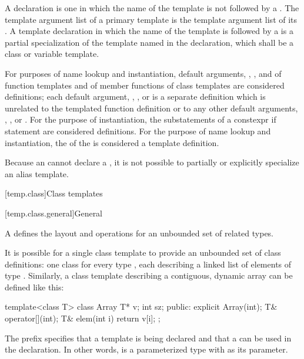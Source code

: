 \pnum
A  declaration is one
in which the name of the template is not followed by
a .
The template argument list of a primary template is
the template argument list of its .
A template declaration in which the name of the template is followed by
a  is
a partial specialization of
the template named in the declaration,
which shall be a class or variable template.

\pnum
For purposes of name lookup and instantiation,
default arguments,
,
,
and
of function templates
and
of member functions of class templates
are considered definitions;
each
default argument,
,
,
or
is a separate definition
which is unrelated
to the templated function definition or
to any other
default arguments,
,
,
or
.
For the purpose of instantiation, the substatements of a constexpr if
statement are considered definitions.
For the purpose of name lookup and instantiation,
the  of the 
is considered a template definition.

\pnum
Because an  cannot declare a
, it is not possible to partially or
explicitly specialize an alias template.

[temp.class]{Class templates}

[temp.class.general]{General}

\pnum
A
defines the layout and operations
for an unbounded set of related types.

\pnum
\begin{example}
It is possible for a single class template
to provide an unbounded set of class definitions:
one class  for every type ,
each describing a linked list of elements of type .
Similarly, a class template  describing a contiguous,
dynamic array can be defined like this:
\begin{codeblock}
template<class T> class Array {
  T* v;
  int sz;
public:
  explicit Array(int);
  T& operator[](int);
  T& elem(int i) { return v[i]; }
};
\end{codeblock}
The prefix 
specifies that a template is being declared and that a
 
can be used in the declaration.
In other words,
is a parameterized type with
as its parameter.
\end{example}

